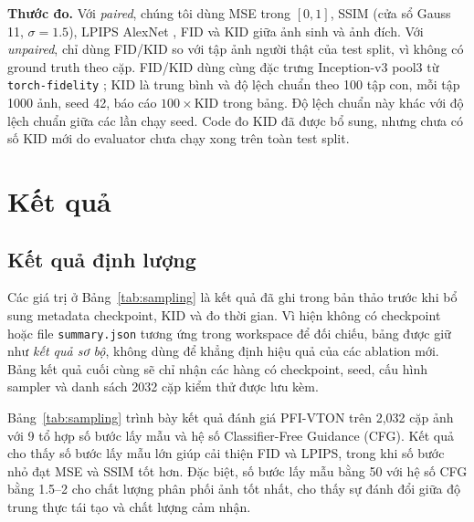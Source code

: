 \documentclass[11pt,a4paper]{article}
\begin{document}
\textbf{Thước đo.} Với \textit{paired}, chúng tôi dùng MSE trong \([0,1]\), SSIM \cite{ssim} (cửa sổ Gauss 11, \(\sigma=1.5\)), LPIPS AlexNet \cite{lpips}, FID \cite{fid} và KID \cite{kid} giữa ảnh sinh và ảnh đích. Với \textit{unpaired}, chỉ dùng FID/KID so với tập ảnh người thật của test split, vì không có ground truth theo cặp. FID/KID dùng cùng đặc trưng Inception-v3 pool3 từ \texttt{torch-fidelity} \cite{torchfidelity}; KID là trung bình và độ lệch chuẩn theo 100 tập con, mỗi tập 1000 ảnh, seed 42, báo cáo \(100\times\mathrm{KID}\) trong bảng. Độ lệch chuẩn này khác với độ lệch chuẩn giữa các lần chạy seed. Code đo KID đã được bổ sung, nhưng chưa có số KID mới do evaluator chưa chạy xong trên toàn test split.

\section{Kết quả}
\subsection{Kết quả định lượng}

Các giá trị ở Bảng~\ref{tab:sampling} là kết quả đã ghi trong bản thảo trước khi bổ sung metadata checkpoint, KID và đo thời gian. Vì hiện không có checkpoint hoặc file \texttt{summary.json} tương ứng trong workspace để đối chiếu, bảng được giữ như \emph{kết quả sơ bộ}, không dùng để khẳng định hiệu quả của các ablation mới. Bảng kết quả cuối cùng sẽ chỉ nhận các hàng có checkpoint, seed, cấu hình sampler và danh sách 2032 cặp kiểm thử được lưu kèm.

Bảng~\ref{tab:sampling} trình bày kết quả đánh giá PFI-VTON trên
2{,}032 cặp ảnh với 9 tổ hợp số bước lấy mẫu và hệ số
Classifier-Free Guidance (CFG). Kết quả cho thấy số bước lấy mẫu lớn giúp cải thiện FID và LPIPS, trong khi số bước nhỏ đạt MSE và SSIM tốt hơn. Đặc biệt, số bước lấy mẫu bằng 50 với hệ số CFG bằng 1.5--2 cho chất lượng phân phối ảnh tốt nhất,
cho thấy sự đánh đổi giữa độ trung thực tái tạo và chất lượng cảm nhận.
\end{document}
